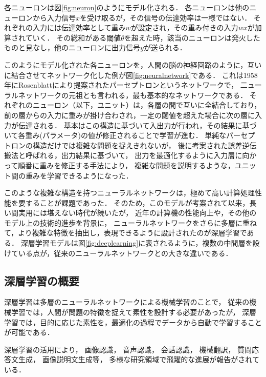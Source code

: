 各ニューロンは図\ref{fig:neuron}のようにモデル化される．
各ニューロンは他のニューロンから入力信号$x$を受け取るが，その信号の伝達効率は一様ではない．
それぞれの入力には伝達効率として重み$w$が設定され，その重み付きの入力$w x$が加算されていく．
その総和がある閾値$\theta$を超えた時，該当のニューロンは発火したものと見なし，他のニューロンに出力信号$y$が送られる．



このようにモデル化された各ニューロンを，人間の脳の神経回路のように，互いに結合させてネットワーク化した例が図\ref{fig:neuralnetwork}である．
これは1958年にRosenblattにより提案されたパーセプトロンというネットワークで，
二ューラルネットワークの元祖とも言われる，最も基本的なネットワークである\cite{rosenblatt1958perceptron}．
それぞれのニューロン（以下，ユニット）は，各層の間で互いに全結合しており，
前の層からの入力に重みが掛け合わされ，一定の閾値を超えた場合に次の層に入力が伝達される．
基本はこの構造に基づいて入出力が行われ，その結果に基づいて各重み(パラメータ)の値が修正されることで学習が進む．
単純なパーセプトロンの構造だけでは複雑な問題を捉えきれないが，
後に考案された誤差逆伝搬法\cite{rumelhart1988learning}と呼ばれる，出力結果に基づいて，
出力を最適化するように入力層に向かって順番に重みを修正する手法により，
複雑な問題を説明するような，ユニット間の重みを学習できるようになった．


このような複雑な構造を持つニューラルネットワークは，極めて高い計算処理性能を要することが課題であった．
そのため，このモデルが考案されて以来，長い間実用には堪えない時代が続いたが，
近年の計算機の性能向上や，その他のモデル上の技術的進歩を背景に，
ニューラルネットワークをさらに多層に重ねて，より複雑な特徴を抽出し，表現できるように設計されたのが深層学習である．
深層学習モデルは図\ref{fig:deeplearning}に表されるように，複数の中間層を設けている点が，従来のニューラルネットワークとの大きな違いである．


\subsection{深層学習の概要}
深層学習は多層のニューラルネットワークによる機械学習のことで，
従来の機械学習では，人間が問題の特徴を捉えて素性を設計する必要があったが，
深層学習では，目的に応じた素性を，最適化の過程でデータから自動で学習することが可能である．

深層学習の活用により，
画像認識\cite{schroff2015facenet,szegedy2014going}，
音声認識\cite{hinton2012deep, bahdanau2015end}，
会話認識\cite{sak2015fast}，
機械翻訳\cite{sutskever2014sequence, dong2015multi}，
質問応答文生成\cite{yin2015neural}，
画像説明文生成\cite{xu2015show,vinyals2014show}等，
多様な研究領域で飛躍的な進展が報告がされている．

